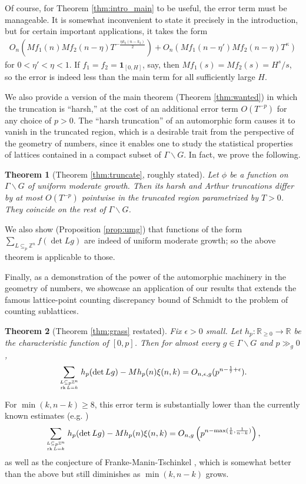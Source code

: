 \documentclass[11pt]{amsart}
\def\R{\mathbb{R}}
\newtheorem{theorem}{Theorem}
\numberwithin{theorem}{section}
\numberwithin{equation}{section}
\theoremstyle{remark}
\theoremstyle{definition}
\newcommand{\Z}{\mathbb{Z}}
\newcommand{\rk}{\mathrm{rk\,}}
\newcommand{\G}{\Gamma}
\begin{document}
Of course, for Theorem \ref{thm:intro_main} to be useful, the error term must be manageable. It is somewhat inconvenient to state it precisely in the introduction, but for certain important applications, it takes the form
\begin{align}\label{eq:intro_error}
O_n\left(Mf_1(n)Mf_2(n-\eta)T^{-\frac{\eta k_2(n-k_2)}{2}}\right) + O_n\left(Mf_1(n-\eta')Mf_2(n-\eta)T^\kappa\right)
\end{align}
for $0 < \eta'<\eta < 1$. If $f_1=f_2=\mathbf 1_{[0,H]}$, say, then $Mf_1(s)=Mf_2(s)=H^s/s$, so the error is indeed less than the main term for all sufficiently large $H$.

We also provide a version of the main theorem (Theorem \ref{thm:wanted}) in which the truncation is ``harsh,'' at the cost of an additional error term $O(T^{-p})$ for any choice of $p > 0$. The ``harsh truncation'' of an automorphic form causes it to vanish in the truncated region, which is a desirable trait from the perspective of the geometry of numbers, since it enables one to study the statistical properties of lattices contained in a compact subset of $\G\backslash G$. In fact, we prove the following.
\begin{theorem}[Theorem \ref{thm:truncate}, roughly stated] \label{thm:intro_truncate}
Let $\phi$ be a function on $\G\backslash G$ of uniform moderate growth. Then its harsh and Arthur truncations differ by at most $O(T^{-p})$ pointwise in the truncated region parametrized by $T>0$. They coincide on the rest of $\G\backslash G$.
\end{theorem}
We also show (Proposition \ref{prop:umg}) that functions of the form $\sum_{L \subseteq_p \Z^n} f(\det Lg)$ are indeed of uniform moderate growth; so the above theorem is applicable to those.

Finally, as a demonstration of the power of the automorphic machinery in the geometry of numbers, we showcase an application of our results that extends the famous lattice-point counting discrepancy bound of Schmidt \cite{Sch60} to the problem of counting sublattices.
\begin{theorem}[Theorem \ref{thm:grass} restated]\label{thm:intro_grass}
Fix $\epsilon > 0$ small. Let $h_p:\R_{\geq0}\rightarrow\R$ be the characteristic function of $[0,p]$. Then for almost every $g \in \Gamma\backslash G$ and $p \gg_g 0$,
\begin{align*}
\sum_{L \subseteq_p \Z^n\atop\rk L=k} h_p(\det Lg) - Mh_p(n)\xi(n,k) = O_{n,\epsilon,g}(p^{n-\frac{1}{7}+\epsilon}).
\end{align*}
\end{theorem}
For $\min(k,n-k)\geq8$, this error term is substantially lower than the currently known estimates (e.g. \cite{Sch68, Thu93, Kim23})
\begin{align*}
\sum_{L \subseteq_p \Z^n\atop\rk L=k} h_p(\det Lg) - Mh_p(n)\xi(n,k) = O_{n,g}\left(p^{n-\max(\frac{1}{k},\frac{1}{n-k})}\right),
\end{align*}
as well as the conjecture of Franke-Manin-Tschinkel \cite[Corollary to Theorem 5]{FMT}, which is somewhat better than the above but still diminishes as $\min(k,n-k)$ grows.
\end{document}
